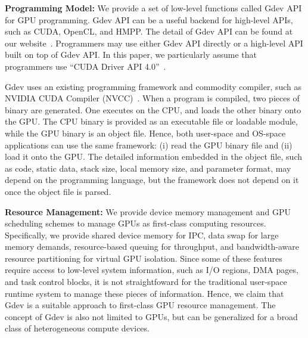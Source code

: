 \textbf{Programming Model:}
We provide a set of low-level functions called Gdev API for GPU
programming.
Gdev API can be a useful backend for high-level APIs, such as CUDA,
OpenCL, and HMPP.
The detail of Gdev API can be found at our website~\cite{Gdev}.
Programmers may use either Gdev API directly or a high-level API built
on top of Gdev API.
In this paper, we particularly assume that programmers use ``CUDA Driver
API 4.0''~\cite{CUDA40}.

Gdev uses an existing programming framework and commodity compiler, such
as NVIDIA CUDA Compiler (NVCC)~\cite{CUDA40}.
When a program is compiled, two pieces of binary are generated.
One executes on the CPU, and loads the other binary onto the GPU.
The CPU binary is provided as an executable file or loadable module,
while the GPU binary is an object file.
Hence, both user-space and OS-space applications can use the same
framework: (i) read the GPU binary file and (ii) load it onto the GPU.
The detailed information embedded in the object file, such as code,
static data, stack size, local memory size, and parameter format, may
depend on the programming language, but the framework does not depend on
it once the object file is parsed.

\textbf{Resource Management:}
We provide device memory management and GPU scheduling schemes to manage
GPUs as first-class computing resources.
Specifically, we provide shared device memory for IPC, data swap for
large memory demands, resource-based queuing for throughput, and
bandwidth-aware resource partitioning for virtual GPU isolation.
Since some of these features require access to low-level system
information, such as I/O regions, DMA pages, and task control blocks, it
is not straightfoward for the traditional user-space runtime system to
manage these pieces of information.
Hence, we claim that Gdev is a suitable approach to first-class GPU
resource management.
The concept of Gdev is also not limited to GPUs, but can be
generalized for a broad class of heterogeneous compute devices.

